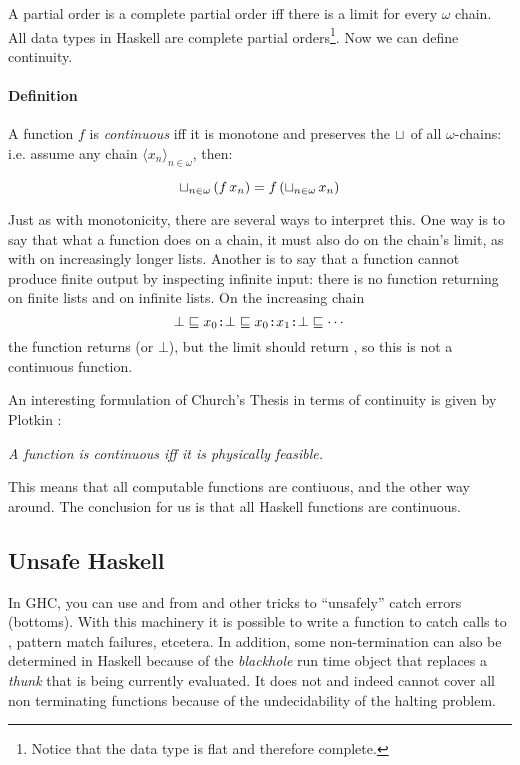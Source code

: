 A partial order is a complete partial order iff there is a limit for
every $\omega$ chain. All data types in Haskell are complete partial
orders\footnote{Notice that the data type  is flat and therefore complete.}. Now we can
define continuity.

\paragraph{Definition} A function $f$ is \emph{continuous} iff it is
monotone and preserves the $\sqcup_{ }$ of all $\omega$-chains: i.e.
assume any chain $\langle x_n \rangle_{n \in \omega}$, then:

\begin{equation*}
\sqcup_{n \in \omega} \, (f \, x_n) = f \, (\sqcup_{n \in \omega} \, x_n)
\end{equation*}

Just as with monotonicity, there are several ways to interpret
this. One way is to say that what a function does on a chain, it must
also do on the chain's limit, as with  on increasingly longer
lists. Another is to say that a function cannot produce finite output by
inspecting infinite input: there is no function
 returning  on finite lists and
 on infinite lists. On the increasing chain
$$ \bot \sqsubseteq x_0 \hs{:} \bot \sqsubseteq x_0 \hs{:} x_1 \hs{:} \bot
\sqsubseteq \cdots$$
the function  returns  (or $\bot$), but the
limit should return , so this is not a continuous function.

An interesting formulation of Church's Thesis in terms of continuity
is given by Plotkin \cite{domains}:

\begin{center}
\emph{A function is continuous iff it is physically feasible.}
\end{center}

This means that all computable functions are contiuous, and the other
way around. The conclusion for us is that all Haskell functions are
continuous.

\subsection{Unsafe Haskell}
In GHC, you can use  and  from
 and other tricks to ``unsafely'' catch errors
(bottoms). With this machinery it is possible to write a function
 to catch calls to , pattern
match failures, etcetera. In addition, some non-termination can also
be determined in Haskell because of the \emph{blackhole} run time
object that replaces a \emph{thunk} that is being currently
evaluated. It does not and indeed cannot cover all non terminating
functions because of the undecidability of the halting problem.

